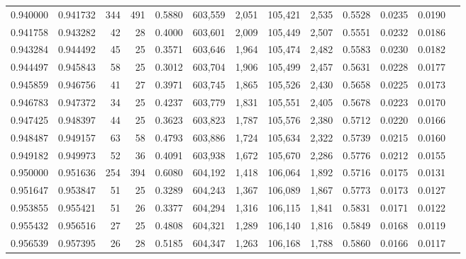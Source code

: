 \begin{tabular}{rrrrrrrrrrrrr}
0.940000 & 0.941732 &   344 & 491 &                                     0.5880 & 603,559 &   2,051 & 105,421 &   2,535 & 0.5528 & 0.0235 & 0.0190 \\
0.941758 & 0.943282 &    42 &  28 &                                     0.4000 & 603,601 &   2,009 & 105,449 &   2,507 & 0.5551 & 0.0232 & 0.0186 \\
0.943284 & 0.944492 &    45 &  25 &                                     0.3571 & 603,646 &   1,964 & 105,474 &   2,482 & 0.5583 & 0.0230 & 0.0182 \\
0.944497 & 0.945843 &    58 &  25 &                                     0.3012 & 603,704 &   1,906 & 105,499 &   2,457 & 0.5631 & 0.0228 & 0.0177 \\
0.945859 & 0.946756 &    41 &  27 &                                     0.3971 & 603,745 &   1,865 & 105,526 &   2,430 & 0.5658 & 0.0225 & 0.0173 \\
0.946783 & 0.947372 &    34 &  25 &                                     0.4237 & 603,779 &   1,831 & 105,551 &   2,405 & 0.5678 & 0.0223 & 0.0170 \\
0.947425 & 0.948397 &    44 &  25 &                                     0.3623 & 603,823 &   1,787 & 105,576 &   2,380 & 0.5712 & 0.0220 & 0.0166 \\
0.948487 & 0.949157 &    63 &  58 &                                     0.4793 & 603,886 &   1,724 & 105,634 &   2,322 & 0.5739 & 0.0215 & 0.0160 \\
0.949182 & 0.949973 &    52 &  36 &                                     0.4091 & 603,938 &   1,672 & 105,670 &   2,286 & 0.5776 & 0.0212 & 0.0155 \\
0.950000 & 0.951636 &   254 & 394 &                                     0.6080 & 604,192 &   1,418 & 106,064 &   1,892 & 0.5716 & 0.0175 & 0.0131 \\
0.951647 & 0.953847 &    51 &  25 &                                     0.3289 & 604,243 &   1,367 & 106,089 &   1,867 & 0.5773 & 0.0173 & 0.0127 \\
0.953855 & 0.955421 &    51 &  26 &                                     0.3377 & 604,294 &   1,316 & 106,115 &   1,841 & 0.5831 & 0.0171 & 0.0122 \\
0.955432 & 0.956516 &    27 &  25 &                                     0.4808 & 604,321 &   1,289 & 106,140 &   1,816 & 0.5849 & 0.0168 & 0.0119 \\
0.956539 & 0.957395 &    26 &  28 &                                     0.5185 & 604,347 &   1,263 & 106,168 &   1,788 & 0.5860 & 0.0166 & 0.0117 \\

\end{tabular}
